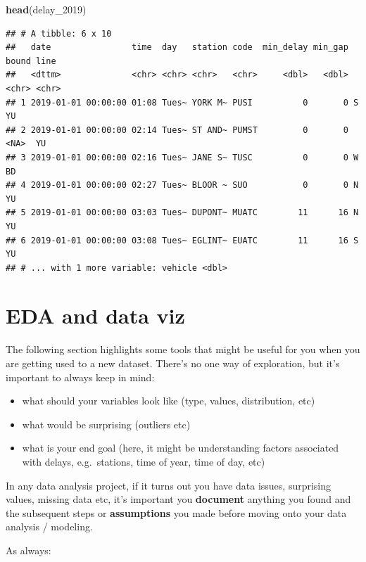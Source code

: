 \documentclass[
]{book}
\newenvironment{Shaded}{\begin{snugshade}}{\end{snugshade}}
\newcommand{\DecValTok}[1]{\textcolor[rgb]{0.00,0.00,0.81}{#1}}
\newcommand{\KeywordTok}[1]{\textcolor[rgb]{0.13,0.29,0.53}{\textbf{#1}}}
\newcommand{\NormalTok}[1]{#1}
\providecommand{\tightlist}{%
  \setlength{\itemsep}{0pt}\setlength{\parskip}{0pt}}
\begin{document}
\begin{Shaded}
\begin{Highlighting}[]
\KeywordTok{head}\NormalTok{(delay_}\DecValTok{2019}\NormalTok{)}
\end{Highlighting}
\end{Shaded}

\begin{verbatim}
## # A tibble: 6 x 10
##   date                time  day   station code  min_delay min_gap bound line 
##   <dttm>              <chr> <chr> <chr>   <chr>     <dbl>   <dbl> <chr> <chr>
## 1 2019-01-01 00:00:00 01:08 Tues~ YORK M~ PUSI          0       0 S     YU   
## 2 2019-01-01 00:00:00 02:14 Tues~ ST AND~ PUMST         0       0 <NA>  YU   
## 3 2019-01-01 00:00:00 02:16 Tues~ JANE S~ TUSC          0       0 W     BD   
## 4 2019-01-01 00:00:00 02:27 Tues~ BLOOR ~ SUO           0       0 N     YU   
## 5 2019-01-01 00:00:00 03:03 Tues~ DUPONT~ MUATC        11      16 N     YU   
## 6 2019-01-01 00:00:00 03:08 Tues~ EGLINT~ EUATC        11      16 S     YU   
## # ... with 1 more variable: vehicle <dbl>
\end{verbatim}

\hypertarget{eda-and-data-viz}{%
\section{EDA and data viz}\label{eda-and-data-viz}}

The following section highlights some tools that might be useful for you when you are getting used to a new dataset. There's no one way of exploration, but it's important to always keep in mind:

\begin{itemize}
\tightlist
\item
  what should your variables look like (type, values, distribution, etc)
\item
  what would be surprising (outliers etc)
\item
  what is your end goal (here, it might be understanding factors associated with delays, e.g.~stations, time of year, time of day, etc)
\end{itemize}

In any data analysis project, if it turns out you have data issues, surprising values, missing data etc, it's important you \textbf{document} anything you found and the subsequent steps or \textbf{assumptions} you made before moving onto your data analysis / modeling.

As always:
\end{document}
